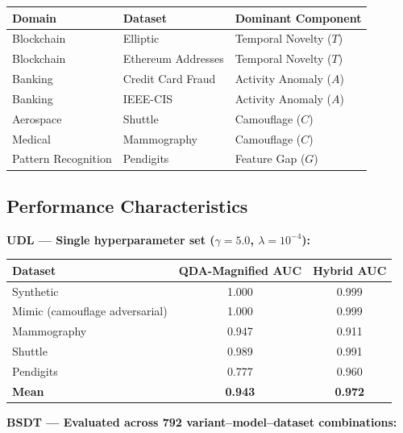 \documentclass[12pt,a4paper]{article}
\begin{document}
\begin{center}
\begin{tabular}{lll}
\toprule
\textbf{Domain} & \textbf{Dataset} & \textbf{Dominant Component} \\
\midrule
Blockchain & Elliptic & Temporal Novelty ($T$) \\
Blockchain & Ethereum Addresses & Temporal Novelty ($T$) \\
Banking & Credit Card Fraud & Activity Anomaly ($A$) \\
Banking & IEEE-CIS & Activity Anomaly ($A$) \\
Aerospace & Shuttle & Camouflage ($C$) \\
Medical & Mammography & Camouflage ($C$) \\
Pattern Recognition & Pendigits & Feature Gap ($G$) \\
\bottomrule
\end{tabular}
\end{center}

\subsection{Performance Characteristics}

\textbf{UDL --- Single hyperparameter set ($\gamma{=}5.0$,
$\lambda{=}10^{-4}$):}

\begin{center}
\begin{tabular}{lcc}
\toprule
\textbf{Dataset} & \textbf{QDA-Magnified AUC} & \textbf{Hybrid AUC} \\
\midrule
Synthetic & 1.000 & 0.999 \\
Mimic (camouflage adversarial) & 1.000 & 0.999 \\
Mammography & 0.947 & 0.911 \\
Shuttle & 0.989 & 0.991 \\
Pendigits & 0.777 & 0.960 \\
\textbf{Mean} & \textbf{0.943} & \textbf{0.972} \\
\bottomrule
\end{tabular}
\end{center}

\textbf{BSDT --- Evaluated across 792 variant--model--dataset
combinations:}
\end{document}
